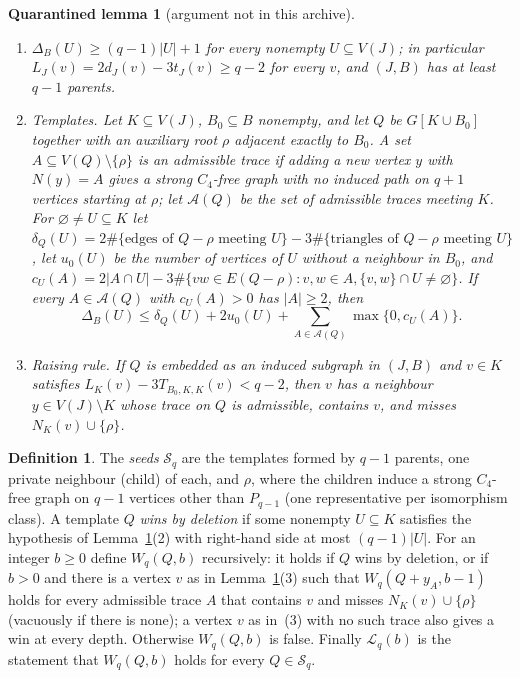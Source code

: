 \documentclass[11pt]{amsart}
\newtheorem{qlemma}[theorem]{Quarantined lemma}
\theoremstyle{definition}
\newtheorem{definition}[theorem]{Definition}
\theoremstyle{remark}
\begin{document}
\begin{qlemma}[argument not in this archive]\label{lem:Lqbasic}
\begin{enumerate}
\item $\Delta_B(U)\ge(q-1)|U|+1$ for every nonempty $U\subseteq V(J)$; in particular $L_J(v)=2d_J(v)-3t_J(v)\ge q-2$ for every $v$, and $(J,B)$ has at least $q-1$ parents.
\item \emph{Templates.} Let $K\subseteq V(J)$, $B_0\subseteq B$ nonempty, and let $Q$ be $G[K\cup B_0]$ together with an auxiliary root $\rho$ adjacent exactly to $B_0$. A set $A\subseteq V(Q)\setminus\{\rho\}$ is an \emph{admissible trace} if adding a new vertex $y$ with $N(y)=A$ gives a strong $C_4$-free graph with no induced path on $q+1$ vertices starting at $\rho$; let $\mathcal A(Q)$ be the set of admissible traces meeting $K$. For $\varnothing\ne U\subseteq K$ let $\delta_Q(U)=2\#\{\text{edges of }Q-\rho\text{ meeting }U\}-3\#\{\text{triangles of }Q-\rho\text{ meeting }U\}$, let $u_0(U)$ be the number of vertices of $U$ without a neighbour in $B_0$, and $c_U(A)=2|A\cap U|-3\#\{vw\in E(Q-\rho):v,w\in A,\{v,w\}\cap U\ne\varnothing\}$. If every $A\in\mathcal A(Q)$ with $c_U(A)>0$ has $|A|\ge2$, then
\[
\Delta_B(U)\le\delta_Q(U)+2u_0(U)+\sum_{A\in\mathcal A(Q)}\max\{0,c_U(A)\}.
\]
\item \emph{Raising rule.} If $Q$ is embedded as an induced subgraph in $(J,B)$ and $v\in K$ satisfies $L_K(v)-3T_{B_0,K,K}(v)<q-2$, then $v$ has a neighbour $y\in V(J)\setminus K$ whose trace on $Q$ is admissible, contains $v$, and misses $N_K(v)\cup\{\rho\}$.
\end{enumerate}
\end{qlemma}

\begin{definition}\label{def:Lq}
The \emph{seeds} $\mathcal S_q$ are the templates formed by $q-1$ parents, one private neighbour (child) of each, and $\rho$, where the children induce a strong $C_4$-free graph on $q-1$ vertices other than $P_{q-1}$ (one representative per isomorphism class). A template $Q$ \emph{wins by deletion} if some nonempty $U\subseteq K$ satisfies the hypothesis of Lemma~\ref{lem:Lqbasic}(2) with right-hand side at most $(q-1)|U|$. For an integer $b\ge0$ define $W_q(Q,b)$ recursively: it holds if $Q$ wins by deletion, or if $b>0$ and there is a vertex $v$ as in Lemma~\ref{lem:Lqbasic}(3) such that $W_q(Q+y_A,b-1)$ holds for every admissible trace $A$ that contains $v$ and misses $N_K(v)\cup\{\rho\}$ (vacuously if there is none); a vertex $v$ as in~(3) with no such trace also gives a win at every depth. Otherwise $W_q(Q,b)$ is false. Finally $\mathcal L_q(b)$ is the statement that $W_q(Q,b)$ holds for every $Q\in\mathcal S_q$.
\end{definition}
\end{document}
